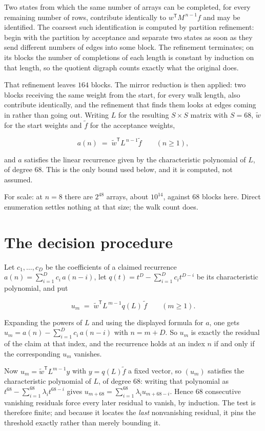 \documentclass[11pt]{article}
\theoremstyle{definition}
\begin{document}
Two states from which the same number of arrays can be completed, for every remaining number of rows, contribute identically to $w^{\mathsf T}M^{\,n-1}f$ and may be identified. The coarsest such identification is computed by partition refinement: begin with the partition by acceptance and separate two states as soon as they send different numbers of edges into some block. The refinement terminates; on its blocks the number of completions of each length is constant by induction on that length, so the quotient digraph counts exactly what the original does.

That refinement leaves $164$ blocks. The mirror reduction is then applied: two blocks receiving the same weight from the start, for every walk length, also contribute identically, and the refinement that finds them looks at edges coming in rather than going out. Writing $L$ for the resulting $S \times S$ matrix with $S = 68$, $\tilde w$ for the start weights and $\tilde f$ for the acceptance weights,

\[a(n) \;=\; \tilde w^{\mathsf T} L^{\,n-1} \tilde f \qquad (n \ge 1),\]

and $a$ satisfies the linear recurrence given by the characteristic polynomial of $L$, of degree $68$. This is the only bound used below, and it is computed, not assumed.

For scale: at $n = 8$ there are $2^{48}$ arrays, about $10^{14}$, against $68$ blocks here. Direct enumeration settles nothing at that size; the walk count does.

\section{The decision procedure}

Let $c_1,\dots,c_D$ be the coefficients of a claimed recurrence $a(n) = \sum_{i=1}^{D} c_i\,a(n-i)$, let $q(t) = t^{D} - \sum_{i=1}^{D} c_i t^{D-i}$ be its characteristic polynomial, and put

\[u_m \;=\; \tilde w^{\mathsf T} L^{\,m-1} q(L)\,\tilde f \qquad (m \ge 1).\]

Expanding the powers of $L$ and using the displayed formula for $a$, one gets $u_m = a(n) - \sum_{i=1}^{D} c_i\,a(n-i)$ with $n = m + D$. So $u_m$ is exactly the residual of the claim at that index, and the recurrence holds at an index $n$ if and only if the corresponding $u_m$ vanishes.

Now $u_m = \tilde w^{\mathsf T} L^{m-1} y$ with $y = q(L)\tilde f$ a fixed vector, so $(u_m)$ satisfies the characteristic polynomial of $L$, of degree $68$: writing that polynomial as $t^{68} - \sum_{i=1}^{68} \lambda_i t^{68-i}$ gives $u_{m+68} = \sum_{i=1}^{68} \lambda_i u_{m+68-i}$. Hence $68$ consecutive vanishing residuals force every later residual to vanish, by induction. The test is therefore finite; and because it locates the {\itshape last} nonvanishing residual, it pins the threshold exactly rather than merely bounding it.
\end{document}
